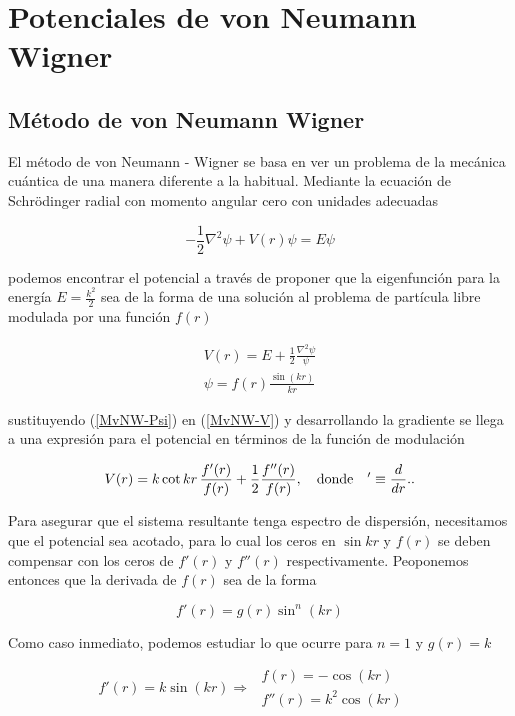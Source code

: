 \section{Potenciales de von Neumann Wigner}
\subsection{Método de von Neumann Wigner}

El método de von Neumann - Wigner se basa en ver un problema de la mecánica cuántica de una manera diferente a la habitual. Mediante la ecuación de Schrödinger radial con momento angular cero con unidades adecuadas 

\begin{equation*}
	-\frac{1}{2} \nabla^2 \psi + V(r) \psi = E \psi
\end{equation*}  

podemos encontrar el potencial a través de proponer que la eigenfunción para la energía $E = \frac{k^2}{2}$ sea de la forma de una solución al problema de partícula libre modulada por una función $f(r)$

\begin{eqnarray}
	\label{MvNW-V}
	V(r)  = E + \frac{1}{2} \frac{\nabla^2 \psi}{\psi} 
	\\
	\label{MvNW-Psi}
	\psi = f(r) \frac{\sin(kr)}{kr}
\end{eqnarray}   

sustituyendo (\ref{MvNW-Psi}) en (\ref{MvNW-V}) y desarrollando la gradiente se llega a una expresión para el potencial en términos de la función de modulación 

\begin{equation*}
	V(r)= k \cot{kr}\,\frac{f'(r)}{f(r)}+\frac{1}{2}\frac{f''(r)}{f(r)}, \quad {\rm donde}\quad '\equiv \frac{d}{dr}.\label{vNW-Vf}.
\end{equation*}

Para asegurar que el sistema resultante tenga espectro de dispersión, necesitamos que el potencial sea acotado, para lo cual los ceros en $\sin{kr}$ y $f(r)$ se deben compensar con los ceros de $f'(r)$ y $f''(r)$ respectivamente. Peoponemos entonces que la derivada de $f(r)$
sea de la forma

\begin{equation*}
f'(r) = g(r)\sin^n(kr)
\end{equation*}

Como caso inmediato, podemos estudiar lo que ocurre para $n=1$ y $g(r)=k$

\begin{equation*}
f'(r) = k \sin(kr) \Rightarrow \,\, 
\begin{matrix}
f(r) = - \cos(kr) & \,
\\
f''(r) = k^2 \cos(kr) & \,
\end{matrix}
\end{equation*}

